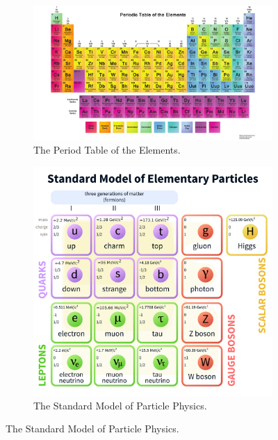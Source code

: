 \begin{figure}[hbp!]
\centering
\begin{subfigure}[c]{0.55\textwidth}
\includegraphics[width=\textwidth]{figs/PeriodicTable.pdf}
\caption{The Period Table of the Elements.}
\end{subfigure}
\begin{subfigure}[c]{0.4\textwidth}
\includegraphics[width=\textwidth]{figs/StandardModelofElementaryParticles.pdf}
\caption{The Standard Model of Particle Physics.}
\end{subfigure}
\end{figure}


